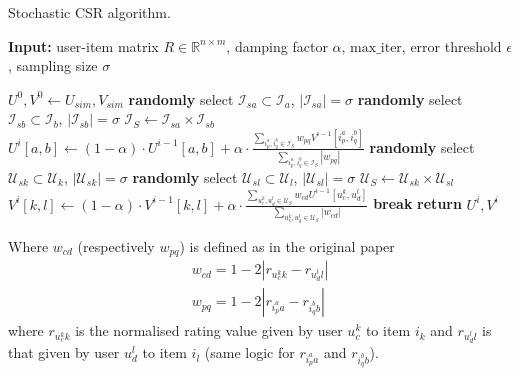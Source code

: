 \documentclass[sigconf]{acmart}
\begin{document}
\small
\begin{algorithm}
\caption{Stochastic CSR algorithm.}
\label{alg:scsr}
\small
\begin{flushleft}
\textbf{Input:} user-item matrix $R\in \mathbb{R}^{n\times m}$, damping factor $\alpha, \, \text{max\_iter}$, error threshold $\epsilon$, sampling size $\sigma$
\end{flushleft}
\begin{algorithmic}[1]
\State $U^0, V^0 \gets U_{sim}, V_{sim}$\vskip 3pt
\vskip 3pt
    \vskip 3pt
        \State \textbf{randomly} select  $\mathcal{I}_{sa} \subset \mathcal{I}_a$,  $|\mathcal{I}_{sa}| = \sigma$\vskip 3pt
        \State \textbf{randomly} select  $\mathcal{I}_{sb} \subset \mathcal{I}_b$, $|\mathcal{I}_{sb}| = \sigma$\vskip 3pt
        \State $\mathcal{I}_S \gets \mathcal{I}_{sa} \times \mathcal{I}_{sb}$
        \State $U^i[a,b] \gets (1-\alpha) \cdot  U^{i-1}[a,b]+ \alpha \cdot \frac{\sum\limits_{i^a_{p}, i^b_{q} \in \mathcal{I}_S} w_{pq} V^{i-1}\left[i^a_p, i^b_q\right]}{\sum\limits_{i^a_{p}, i^b_{q} \in \mathcal{I}_S} \left| w_{pq} \right| }$
    \EndFor
    \vskip 3pt
        \State \textbf{randomly} select  $\mathcal{U}_{sk} \subset \mathcal{U}_k$,  $|\mathcal{U}_{sk}| = \sigma$\vskip 3pt
        \State \textbf{randomly} select  $\mathcal{U}_{sl} \subset \mathcal{U}_l$, $|\mathcal{U}_{sl}| = \sigma$\vskip 3pt
        \State $\mathcal{U}_S \gets \mathcal{U}_{sk} \times \mathcal{U}_{sl}$
        \State $V^i[k,l] \gets (1-\alpha) \cdot  V^{i-1}[k,l]+ \alpha \cdot \frac{\sum\limits_{u^k_{c}, u^l_{d} \in \mathcal{U}_S} w_{cd} U^{i-1}\left[u_c^k, u_d^l\right]}{\sum\limits_{u^k_{c}, u^l_{d} \in \mathcal{U}_S} \left| w_{cd}\right|}$
    \EndFor
    \vskip 3pt
    \State \textbf{break}
    \EndIf\vskip 3pt
\EndFor
\State \textbf{return} $U^i, V^i$
\end{algorithmic}
\end{algorithm}

\normalsize
\begin{flushleft}
Where $w_{cd}$ (respectively $w_{pq}$) is defined as in the original paper
\begin{align*}
    w_{cd} = 1-2|r_{u^{k}_{c}k} - r_{u^{l}_{d}l}|\\
    w_{pq} = 1-2|r_{i^{a}_{p}a} - r_{i^{b}_{q}b}|
\end{align*}
where $r_{u^{k}_{c}k}$ is the normalised rating value given by user $u^{k}_{c}$ to item $i_k$ and $r_{u^{l}_{d}l}$ is that given by user $u^{l}_{d}$ to item $i_l$ (same logic for $r_{i^{a}_{p}a}$ and $r_{i^{b}_{q}b}$).
\end{flushleft}
\end{document}
